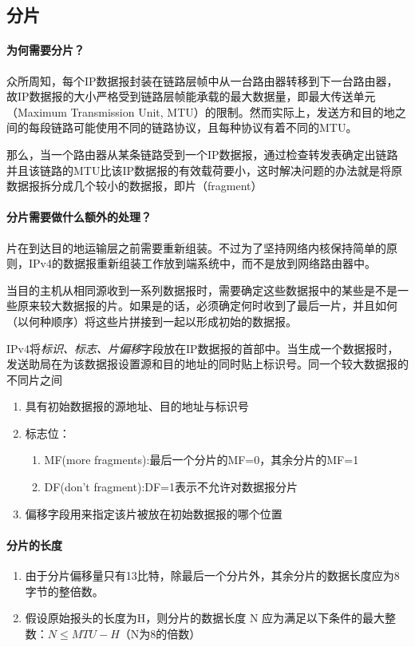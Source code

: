 \documentclass[]{report}
\begin{document}
		\subsection{分片}
			\paragraph{为何需要分片？}
			众所周知，每个IP数据报封装在链路层帧中从一台路由器转移到下一台路由器，故IP数据报的大小严格受到链路层帧能承载的最大数据量，即最大传送单元（Maximum Transmission Unit, MTU）的限制。然而实际上，发送方和目的地之间的每段链路可能使用不同的链路协议，且每种协议有着不同的MTU。\par
			那么，当一个路由器从某条链路受到一个IP数据报，通过检查转发表确定出链路并且该链路的MTU比该IP数据报的有效载荷要小，这时解决问题的办法就是将原数据报拆分成几个较小的数据报，即片（fragment）
			\paragraph{分片需要做什么额外的处理？}
			片在到达目的地运输层之前需要重新组装。不过为了坚持网络内核保持简单的原则，IPv4的数据报重新组装工作放到端系统中，而不是放到网络路由器中。\par
			当目的主机从相同源收到一系列数据报时，需要确定这些数据报中的某些是不是一些原来较大数据报的片。如果是的话，必须确定何时收到了最后一片，并且如何（以何种顺序）将这些片拼接到一起以形成初始的数据报。\par
			IPv4将\textit{标识、标志、片偏移}字段放在IP数据报的首部中。当生成一个数据报时，发送助局在为该数据报设置源和目的地址的同时贴上标识号。同一个较大数据报的不同片之间
			\begin{enumerate}
				\item 具有初始数据报的源地址、目的地址与标识号
				\item 标志位：
				\begin{enumerate}
					\item MF(more fragments):最后一个分片的MF=0，其余分片的MF=1
					\item DF(don’t fragment):DF=1表示不允许对数据报分片
				\end{enumerate}
				\item 偏移字段用来指定该片被放在初始数据报的哪个位置
			\end{enumerate}\par
			\paragraph{分片的长度}
			\begin{enumerate}
				\item 由于分片偏移量只有13比特，除最后一个分片外，其余分片的数据长度应为8字节的整倍数。
				\item 假设原始报头的长度为H，则分片的数据长度 N 应为满足以下条件的最大整数：$ N \le MTU - H $（N为8的倍数）
			\end{enumerate}
\end{document}
